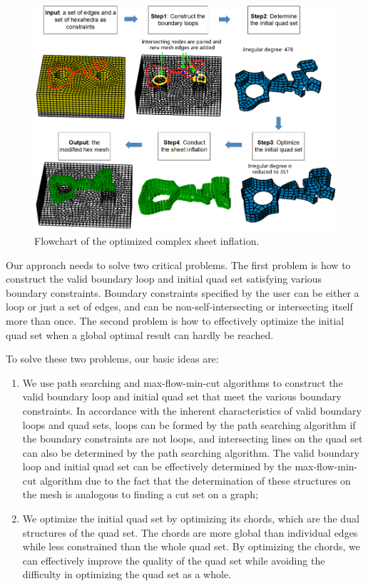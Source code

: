 \documentclass[final,5p,times,twocolumn]{elsarticle}
\begin{document}
\begin{figure}[htbp]
\begin{center}
\includegraphics[width=16cm]{overview2.png}
\caption{Flowchart of the optimized complex sheet inflation.}
\label{fig:overview}
\end{center}
\end{figure}

Our approach needs to solve two critical problems. The first problem is how to construct the valid boundary loop and initial quad set satisfying various boundary constraints. Boundary constraints specified by the user can be either a loop or just a set of edges, and can be non-self-intersecting or intersecting itself more than once. The second problem is how to effectively optimize the initial quad set when a global optimal result can hardly be reached.

To solve these two problems, our basic ideas are:
\begin{enumerate}
  \item We use path searching and max-flow-min-cut algorithms to construct the valid boundary loop and initial quad set that meet the various boundary constraints. In accordance with the inherent characteristics of valid boundary loops and quad sets, loops can be formed by the path searching algorithm if the boundary constraints are not loops, and intersecting lines on the quad set can also be determined by the path searching algorithm. The valid boundary loop and initial quad set can be effectively determined by the max-flow-min-cut algorithm due to the fact that the determination of these structures on the mesh is analogous to finding a cut set on a graph;
  \item We optimize the initial quad set by optimizing its chords, which are the dual structures of the quad set. The chords are more global than individual edges while less constrained than the whole quad set. By optimizing the chords, we can effectively improve the quality of the quad set while avoiding the difficulty in optimizing the quad set as a whole.
\end{enumerate}
\end{document}
